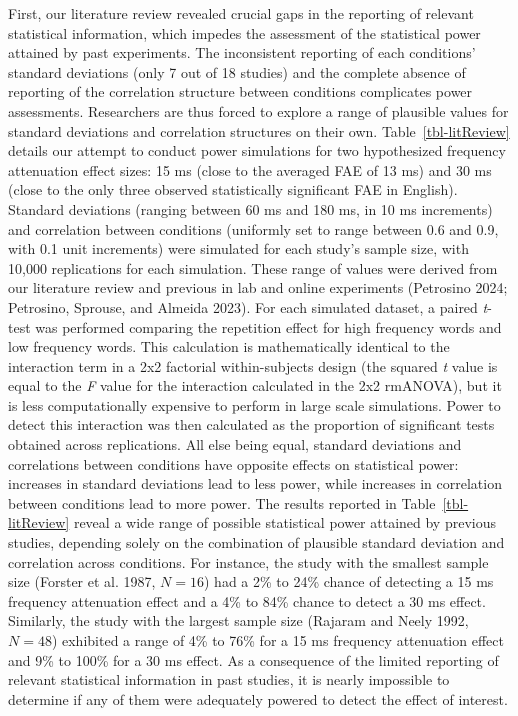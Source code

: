 \documentclass[
]{interact}
\begin{document}
First, our literature review revealed crucial gaps in the reporting of
relevant statistical information, which impedes the assessment of the
statistical power attained by past experiments. The inconsistent
reporting of each conditions' standard deviations (only 7 out of 18
studies) and the complete absence of reporting of the correlation
structure between conditions complicates power assessments. Researchers
are thus forced to explore a range of plausible values for standard
deviations and correlation structures on their own.
Table~\ref{tbl-litReview} details our attempt to conduct power
simulations for two hypothesized frequency attenuation effect sizes: 15
ms (close to the averaged FAE of 13 ms) and 30 ms (close to the only
three observed statistically significant FAE in English). Standard
deviations (ranging between 60 ms and 180 ms, in 10 ms increments) and
correlation between conditions (uniformly set to range between 0.6 and
0.9, with 0.1 unit increments) were simulated for each study's sample
size, with 10,000 replications for each simulation. These range of
values were derived from our literature review and previous in lab and
online experiments (Petrosino 2024; Petrosino, Sprouse, and Almeida
2023). For each simulated dataset, a paired \emph{t}-test was performed
comparing the repetition effect for high frequency words and low
frequency words. This calculation is mathematically identical to the
interaction term in a 2x2 factorial within-subjects design (the squared
\emph{t} value is equal to the \emph{F} value for the interaction
calculated in the 2x2 rmANOVA), but it is less computationally expensive
to perform in large scale simulations. Power to detect this interaction
was then calculated as the proportion of significant tests obtained
across replications. All else being equal, standard deviations and
correlations between conditions have opposite effects on statistical
power: increases in standard deviations lead to less power, while
increases in correlation between conditions lead to more power. The
results reported in Table~\ref{tbl-litReview} reveal a wide range of
possible statistical power attained by previous studies, depending
solely on the combination of plausible standard deviation and
correlation across conditions. For instance, the study with the smallest
sample size (Forster et al. 1987, \(N=16\)) had a 2\% to 24\% chance of
detecting a 15 ms frequency attenuation effect and a 4\% to 84\% chance
to detect a 30 ms effect. Similarly, the study with the largest sample
size (Rajaram and Neely 1992, \(N=48\)) exhibited a range of 4\% to 76\%
for a 15 ms frequency attenuation effect and 9\% to 100\% for a 30 ms
effect. As a consequence of the limited reporting of relevant
statistical information in past studies, it is nearly impossible to
determine if any of them were adequately powered to detect the effect of
interest.
\end{document}
